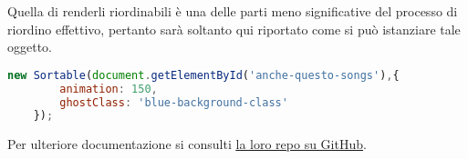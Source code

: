Quella di renderli riordinabili è una delle parti meno significative del processo di riordino effettivo, pertanto sarà soltanto qui riportato come si può istanziare tale oggetto.
\begin{lstlisting}[language=JavaScript]
new Sortable(document.getElementById('anche-questo-songs'),{
        animation: 150,
        ghostClass: 'blue-background-class'
    });
\end{lstlisting}

Per ulteriore documentazione si consulti \href{https://github.com/SortableJS/Sortable}{\underline{la loro repo su GitHub}}.
\newpage